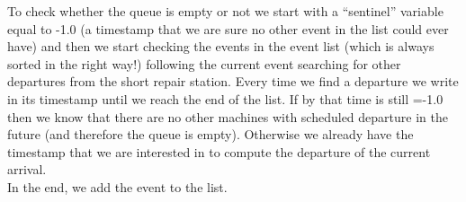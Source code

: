 \documentclass[12pt]{article}
\begin{document}
To check whether the queue is empty or not we start with a ``sentinel'' variable  equal to -1.0 (a timestamp that we are sure no other event in the list could ever have) and then we start checking the events in the event list (which is always sorted in the right way!) following the current event searching for other departures from the short repair station. Every time we find a departure we write in  its timestamp until we reach the end of the list. If by that time  is still =-1.0 then we know that there are no other machines with scheduled departure in the future (and therefore the queue is empty). Otherwise we already have the timestamp that we are interested in to compute the departure of the current arrival.\\
In the end, we add the event to the list.
\end{document}
